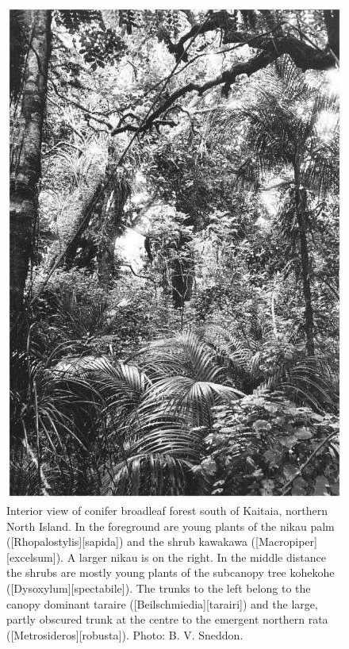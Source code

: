 \begin{figure}[htb]
\begin{minipage}[t]{0.55\textwidth}
    	\includegraphics[width=.8\textwidth]{graphics/figure8conifer.jpg}
    	\caption[Interior view of conifer broadleaf forest south of Kaitaia]{Interior view of conifer broadleaf forest south of Kaitaia, northern North Island.
    	In the foreground are young plants of the nikau palm ([Rhopalostylis][sapida]) and the shrub kawakawa ([Macropiper][excelsum]).
    	A larger nikau is on the right.
    	In the middle distance the shrubs are mostly young plants of the subcanopy tree kohekohe ([Dysoxylum][spectabile]).
    	The trunks to the left belong to the canopy dominant taraire ([Beilschmiedia][tarairi]) and the large, partly obscured trunk at the centre to the emergent northern rata ([Metrosideros][robusta]).
    	Photo: B. V. Sneddon.}%
    	\label{fig:8conifer}
	\end{minipage}
\end{figure}

